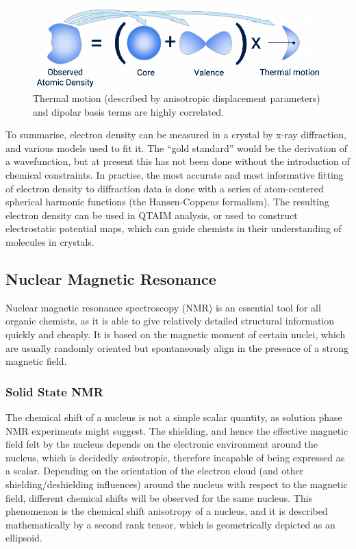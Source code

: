 \begin{refsection}
\begin{figure}
    \centering
    \includegraphics[width=0.6\linewidth]{Figures/valencevsthermaled.pdf}
    \caption{Thermal motion (described by anisotropic displacement parameters) and dipolar basis terms are highly correlated.}
    \label{fig:adp-dipole}
\end{figure}

To summarise, electron density can be measured in a crystal by x-ray diffraction, and various models used to fit it.
The ``gold standard'' would be the derivation of a wavefunction, but at present this has not been done without the introduction of chemical constraints.
In practise, the most accurate and most informative fitting of electron density to diffraction data is done with a series of atom-centered spherical harmonic functions (the Hansen-Coppens formalism).
The resulting electron density can be used in QTAIM analysis, or used to construct electrostatic potential maps, which can guide chemists in their understanding of molecules in crystals.

\subsection{Nuclear Magnetic Resonance}
Nuclear magnetic resonance spectroscopy (NMR) is an essential tool for all organic chemists, as it is able to give relatively detailed structural information quickly and cheaply.
It is based on the magnetic moment of certain nuclei, which are usually randomly oriented but spontaneously align in the presence of a strong magnetic field.

\subsubsection{Solid State NMR}
The chemical shift of a nucleus is not a simple scalar quantity, as solution phase NMR experiments might suggest.
The shielding, and hence the effective magnetic field felt by the nucleus depends on the electronic environment around the nucleus, which is decidedly \emph{an}isotropic, therefore incapable of being expressed as a scalar.
Depending on the orientation of the electron cloud (and other shielding/deshielding influences) around the nucleus with respect to the magnetic field, different chemical shifts will be observed for the same nucleus.
This phenomenon is the chemical shift anisotropy of a nucleus, and it is described mathematically by a second rank tensor, which is geometrically depicted as an ellipsoid.


\end{refsection}
